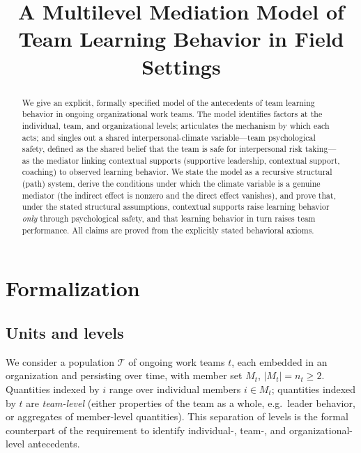 \documentclass{amsart}
\theoremstyle{definition}
\theoremstyle{remark}
\begin{document}
\title{A Multilevel Mediation Model of Team Learning Behavior in Field Settings}
\maketitle

\begin{abstract}
We give an explicit, formally specified model of the antecedents of team
learning behavior in ongoing organizational work teams. The model
identifies factors at the individual, team, and organizational levels;
articulates the mechanism by which each acts; and singles out a shared
interpersonal-climate variable---team psychological safety, defined as the
shared belief that the team is safe for interpersonal risk taking---as the
mediator linking contextual supports (supportive leadership, contextual
support, coaching) to observed learning behavior. We state the model as a
recursive structural (path) system, derive the conditions under which the
climate variable is a genuine mediator (the indirect effect is nonzero and
the direct effect vanishes), and prove that, under the stated structural
assumptions, contextual supports raise learning behavior \emph{only}
through psychological safety, and that learning behavior in turn raises
team performance. All claims are proved from the explicitly stated
behavioral axioms.
\end{abstract}

\section{Formalization}

\subsection{Units and levels}
We consider a population $\mathcal{T}$ of ongoing work teams $t$, each
embedded in an organization and persisting over time, with member set
$M_t$, $|M_t|=n_t\ge 2$. Quantities indexed by $i$ range over individual
members $i\in M_t$; quantities indexed by $t$ are \emph{team-level}
(either properties of the team as a whole, e.g.\ leader behavior, or
aggregates of member-level quantities). This separation of levels is the
formal counterpart of the requirement to identify individual-, team-, and
organizational-level antecedents.
\end{document}

